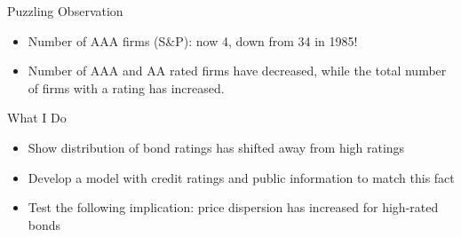 \documentclass{beamer}
\begin{document}
\begin{frame}{Puzzling Observation}
\begin{itemize}
	\item Number of AAA firms (S\&P): now 4, down from 34 in 1985!
	\item Number of AAA and AA rated firms have decreased, while the total number of firms with a rating has increased. 
\end{itemize}
\vspace{0.35cm}
\end{frame}

{


}

\begin{frame}{What I Do}
\begin{itemize}
	\item Show distribution of bond ratings has shifted away from high ratings
	\item Develop a model with credit ratings and public information to match this fact
	\item Test the following implication: price dispersion has increased for high-rated bonds
\end{itemize}
\end{frame}
\end{document}
